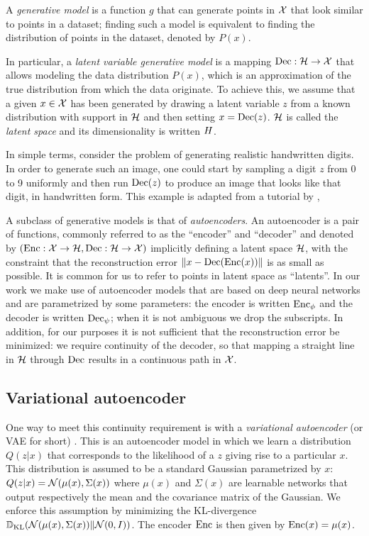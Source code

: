 \documentclass[../main.tex]{subfiles}
\begin{document}
A \emph{generative model} is a function $g$ that can generate points in $\mathcal{X}$ that look similar to points in a dataset; finding such a model is equivalent to finding the distribution of points in the dataset, denoted by $P(x)$.

In particular, a \emph{latent variable generative model} is a mapping $\operatorname{Dec}: \mathcal{H} \to \mathcal{X}$ that allows modeling the data distribution $P(x)$, which is an approximation
of the true distribution from which the data originate.
To achieve this, we assume that a given $x \in \mathcal{X}$ has been generated by drawing a latent variable $z$ from a known distribution with support in $\mathcal{H}$ and then setting $x = \operatorname{Dec}(z)$.
$\mathcal{H}$ is called the \emph{latent space} and its dimensionality is written $H$.

In simple terms, consider the problem of generating realistic handwritten digits.
In order to generate such an image, one could start by sampling a digit $z$ from 0 to 9 uniformly and then
run $\operatorname{Dec}(z)$ to produce an image that looks like that digit, in handwritten form.
This example is adapted from a tutorial by \citeauthor{doerschTutorial2021} \cite{doerschTutorial2021},

A subclass of generative models is that of \emph{autoencoders}.
An autoencoder is a pair of functions, commonly referred to as the ``encoder'' and ``decoder'' and denoted by $(\operatorname{Enc}: \mathcal{X} \to \mathcal{H}, \operatorname{Dec}: \mathcal{H} \to \mathcal{X})$ implicitly defining a latent space $\mathcal{H}$, with the constraint that the reconstruction error $\left\lVert x - \operatorname{Dec}(\operatorname{Enc}(x))\right\rVert$ is as small as possible.
It is common for us to refer to points in latent space as ``latents''.
In our work we make use of autoencoder models that are based on deep neural networks and are parametrized by some parameters:
the encoder is written $\operatorname{Enc}_\phi$ and the decoder is written $\operatorname{Dec}_\psi$; when it is not ambiguous we drop the subscripts.
In addition, for our purposes it is not sufficient that the reconstruction error be minimized: we require continuity of the decoder, so that mapping a straight line in $\mathcal{H}$ through $\operatorname{Dec}$ results in a continuous path in $\mathcal{X}$.

\subsection{Variational autoencoder}

One way to meet this continuity requirement is with a \emph{variational autoencoder} (or VAE for short) \cite{kingmaAutoEncoding2014}.
This is an autoencoder model in which we learn a distribution $Q(z | x)$ that corresponds to the likelihood of a $z$ giving rise to a particular $x$.
This distribution is assumed to be a standard Gaussian parametrized by $x$: $Q(z | x) = \mathcal{N}(\mu(x), \Sigma(x))$ where $\mu(x)$ and $\Sigma(x)$ are learnable networks that output respectively the mean and the covariance matrix of the Gaussian.
We enforce this assumption by minimizing the KL-divergence $\mathbb{D}_\text{KL}(\mathcal{N}(\mu(x), \Sigma(x)) \| \mathcal{N}(0, I))$.
The encoder $\operatorname{Enc}$ is then given by $\operatorname{Enc}(x) = \mu(x)$.
\end{document}

